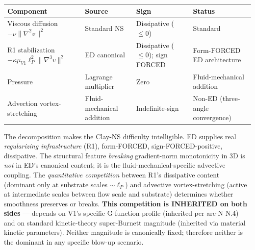 \documentclass[
]{article}
\newcounter{none} %
\begin{document}
{\def\LTcaptype{none} %
\begin{longtable}[]{@{}
  >{\raggedright\arraybackslash}p{}
  >{\raggedright\arraybackslash}p{}
  >{\raggedright\arraybackslash}p{}
  >{\raggedright\arraybackslash}p{}@{}}
\toprule\noalign{}
\begin{minipage}[b]{\linewidth}\raggedright
Component
\end{minipage} & \begin{minipage}[b]{\linewidth}\raggedright
Source
\end{minipage} & \begin{minipage}[b]{\linewidth}\raggedright
Sign
\end{minipage} & \begin{minipage}[b]{\linewidth}\raggedright
Status
\end{minipage} \\
\midrule\noalign{}
\endhead
\bottomrule\noalign{}
\endlastfoot
Viscous diffusion \(-\nu\|\nabla^2 v\|^2\) & Standard NS & Dissipative
(\(\le 0\)) & Standard \\
R1 stabilization \(-\kappa\mu_{V1}\ell_P^2\|\nabla^3 v\|^2\) & ED
canonical & Dissipative (\(\le 0\)); sign FORCED & Form-FORCED ED
architecture \\
Pressure & Lagrange multiplier & Zero & Fluid-mechanical addition \\
Advection vortex-stretching & Fluid-mechanical addition &
Indefinite-sign & Non-ED (three-angle convergence) \\
\end{longtable}
}

The decomposition makes the Clay-NS difficulty intelligible. ED supplies
real \emph{regularizing infrastructure} (R1), form-FORCED,
sign-FORCED-positive, dissipative. The structural feature
\emph{breaking} gradient-norm monotonicity in 3D is \emph{not} in ED's
canonical content; it is the fluid-mechanical-specific advective
coupling. The \emph{quantitative competition} between R1's dissipative
content (dominant only at substrate scales \(\sim \ell_P\)) and
advective vortex-stretching (active at intermediate scales between flow
scale and substrate) determines whether smoothness preserves or breaks.
\textbf{This competition is INHERITED on both sides} --- depends on V1's
specific G-function profile (inherited per arc-N N.4) and on standard
kinetic-theory super-Burnett magnitude (inherited via material kinetic
parameters). Neither magnitude is canonically fixed; therefore neither
is the dominant in any specific blow-up scenario.
\end{document}
